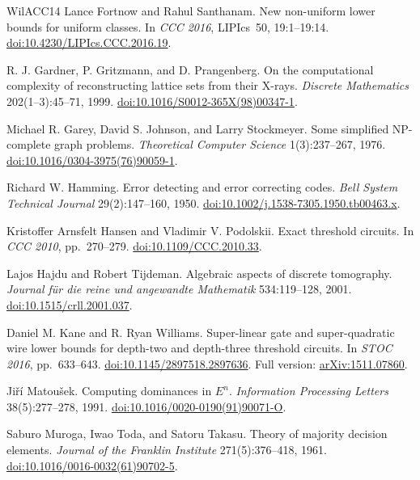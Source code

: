 \documentclass[11pt,letterpaper]{article}
\theoremstyle{definition}
\theoremstyle{remark}
\begin{document}
\begin{thebibliography}{WilACC14}
Lance Fortnow and Rahul Santhanam. New non-uniform lower bounds for
uniform classes. In \emph{CCC 2016}, LIPIcs~50, 19:1--19:14.
\href{https://doi.org/10.4230/LIPIcs.CCC.2016.19}{doi:10.4230/LIPIcs.CCC.2016.19}.

R. J. Gardner, P. Gritzmann, and D. Prangenberg.
On the computational complexity of reconstructing lattice sets from their X-rays.
\emph{Discrete Mathematics} 202(1--3):45--71, 1999.
\href{https://doi.org/10.1016/S0012-365X(98)00347-1}{doi:10.1016/S0012-365X(98)00347-1}.

Michael R. Garey, David S. Johnson, and Larry Stockmeyer.
Some simplified NP-complete graph problems.
\emph{Theoretical Computer Science} 1(3):237--267, 1976.
\href{https://doi.org/10.1016/0304-3975(76)90059-1}{doi:10.1016/0304-3975(76)90059-1}.

Richard W. Hamming.
Error detecting and error correcting codes.
\emph{Bell System Technical Journal} 29(2):147--160, 1950.
\href{https://doi.org/10.1002/j.1538-7305.1950.tb00463.x}{doi:10.1002/j.1538-7305.1950.tb00463.x}.

Kristoffer Arnsfelt Hansen and Vladimir V. Podolskii.
Exact threshold circuits. In \emph{CCC 2010}, pp.~270--279.
\href{https://doi.org/10.1109/CCC.2010.33}{doi:10.1109/CCC.2010.33}.

Lajos Hajdu and Robert Tijdeman. Algebraic aspects of discrete tomography.
\emph{Journal f\"ur die reine und angewandte Mathematik} 534:119--128, 2001.
\href{https://doi.org/10.1515/crll.2001.037}{doi:10.1515/crll.2001.037}.

Daniel M. Kane and R. Ryan Williams.
Super-linear gate and super-quadratic wire lower bounds for depth-two
and depth-three threshold circuits.
In \emph{STOC 2016}, pp.~633--643.
\href{https://doi.org/10.1145/2897518.2897636}{doi:10.1145/2897518.2897636}.
Full version: \href{https://arxiv.org/abs/1511.07860}{arXiv:1511.07860}.

Ji\v{r}\'i Matou\v{s}ek. Computing dominances in \(E^n\).
\emph{Information Processing Letters} 38(5):277--278, 1991.
\href{https://doi.org/10.1016/0020-0190(91)90071-O}{doi:10.1016/0020-0190(91)90071-O}.

Saburo Muroga, Iwao Toda, and Satoru Takasu.
Theory of majority decision elements.
\emph{Journal of the Franklin Institute} 271(5):376--418, 1961.
\href{https://doi.org/10.1016/0016-0032(61)90702-5}{doi:10.1016/0016-0032(61)90702-5}.


\end{thebibliography}
\end{document}
